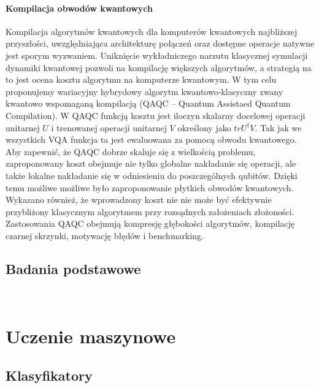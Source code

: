 \documentclass[a4paper,11pt]{article}
\begin{document}
\paragraph{Kompilacja obwodów kwantowych} Kompilacja algorytmów kwantowych dla komputerów kwantowych najbliższej przyszłości, uwzględniająca architekturę połączeń oraz dostępne operacje natywne jest sporym wyzwaniem. Uniknięcie wykładniczego narzutu klasycznej symulacji dynamiki kwantowej pozwoli na kompilację większych algorytmów, a strategią na to jest ocena kosztu algorytmu na komputerze kwantowym. W tym celu proponujemy wariacyjny hybrydowy algorytm kwantowo-klasyczny zwany kwantowo wspomaganą kompilacją (QAQC -- Quantum Assistaed Quantum Compilation). 
%
W QAQC funkcją kosztu jest iloczyn skalarny docelowej operacji unitarnej $U$ i trenowanej operacji unitarnej $V$ określony jako $tr U^\dagger V$. Tak jak we wszystkich VQA funkcja ta jest ewaluowana za pomocą obwodu kwantowego.
%
Aby zapewnić, że QAQC dobrze skaluje się z wielkością problemu, zaproponowany koszt obejmuje nie tylko globalne nakładanie się operacji, ale także lokalne nakładanie się w odniesieniu do poszczególnych qubitów. Dzięki temu możliwe możliwe było zaproponowanie płytkich obwodów kwantowych. Wykazano również, że wprowadzony koszt nie nie może być efektywnie przybliżony klasycznym algorytmem przy rozsądnych założeniach złożoności.
% 
Zastosowania QAQC obejmują kompresję głębokości algorytmów, kompilację czarnej skrzynki, motywację błędów i benchmarking.
\newpage
\subsection{Badania podstawowe}


\newpage
\ 
\newpage

\section{Uczenie maszynowe}
\newpage
\subsection{Klasyfikatory}
\newpage
\end{document}
